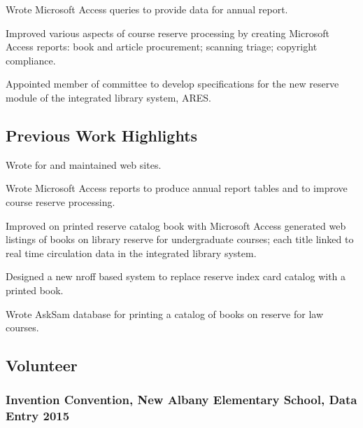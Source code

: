 \documentclass[lettersize,12pt,]{article}
\begin{document}
\begin{compactitem}
\itemsep1pt\parskip0pt

\item Wrote Microsoft Access queries to provide data for annual report.

\item Improved various aspects of course reserve processing by creating Microsoft Access reports: book and article procurement; scanning triage; copyright compliance.

\item Appointed member of committee to develop specifications for the new reserve module of the integrated library system, ARES.

\end{compactitem}




\subsection{Previous Work Highlights}
\begin{compactitem}

\item Wrote for and maintained web sites.

\item Wrote Microsoft Access reports to produce annual report tables and to improve course reserve processing.

\item Improved on printed reserve catalog book with Microsoft Access generated web listings of books on library reserve for undergraduate courses; each title linked to real time circulation data in the integrated library system.

\item Designed a new nroff based system to replace reserve index card catalog with a printed book.

\item Wrote AskSam database for printing a catalog of books on reserve for law courses.

\end{compactitem}

\subsection{Volunteer}\label{volunteer}


\subsubsection{Invention Convention, New Albany Elementary School, Data Entry \hfill 2015}
\end{document}

